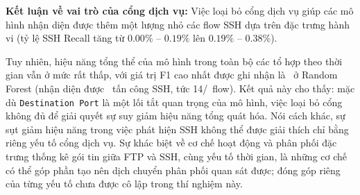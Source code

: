 \noindent\textbf{Kết luận về vai trò của cổng dịch vụ:}
Việc loại bỏ cổng dịch vụ giúp các mô hình nhận diện được thêm một lượng nhỏ các flow SSH dựa trên đặc trưng hành vi (tỷ lệ SSH Recall tăng từ $0.00\% \text{ -- } 0.19\%$ lên $0.19\% \text{ -- } 0.38\%$).

Tuy nhiên, hiệu năng tổng thể của mô hình trong toàn bộ các tổ hợp theo thời gian vẫn ở mức rất thấp, với giá trị F1 cao nhất được ghi nhận là \RFTestWithoutPortFOne\ ở Random Forest (nhận diện được \RFTestWithoutPortSSHRecall\ tấn công SSH, tức 14/\DataTestSSH\ flow). Kết quả này cho thấy: mặc dù \texttt{Destination Port} là một lối tắt quan trọng của mô hình, việc loại bỏ cổng không đủ để giải quyết sự suy giảm hiệu năng tổng quát hóa. Nói cách khác, sự sụt giảm hiệu năng trong việc phát hiện SSH không thể được giải thích chỉ bằng riêng yếu tố cổng dịch vụ. Sự khác biệt về cơ chế hoạt động và phân phối đặc trưng thống kê gói tin giữa FTP và SSH, cùng yếu tố thời gian, là những cơ chế có thể góp phần tạo nên dịch chuyển phân phối quan sát được; đóng góp riêng của từng yếu tố chưa được cô lập trong thí nghiệm này.
